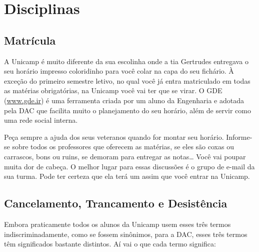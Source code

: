 \section{Disciplinas}

\subsection{Matrícula}

A Unicamp é muito diferente da sua escolinha onde a tia Gertrudes entregava
o seu horário impresso coloridinho para você colar na capa do seu fichário.
À exceção do primeiro semestre letivo, no qual você já entra matriculado em
todas as matérias obrigatórias, na Unicamp você vai ter que se virar.  O GDE
(\url{www.gde.ir}) é uma ferramenta criada por um aluno da Engenharia e adotada
pela DAC que facilita muito o planejamento do seu horário, além de servir como
uma rede social interna.

Peça sempre a ajuda dos seus veteranos quando for montar seu horário. Informe-se
sobre todos os professores que oferecem as matérias, se eles são coxas ou
carrascos, bons ou ruins, se demoram para entregar as notas{\dots} Você vai
poupar muita dor de cabeça. O melhor lugar para essas discussões é o grupo de
e-mail da sua turma.  Pode ter certeza que ela terá um assim que você entrar na
Unicamp.

\subsection{Cancelamento, Trancamento e Desistência}

Embora praticamente todos os alunos da Unicamp usem esses três termos
indiscriminadamente, como se fossem sinônimos, para a DAC, esses três termos têm
significados bastante distintos. Aí vai o que cada termo significa:

